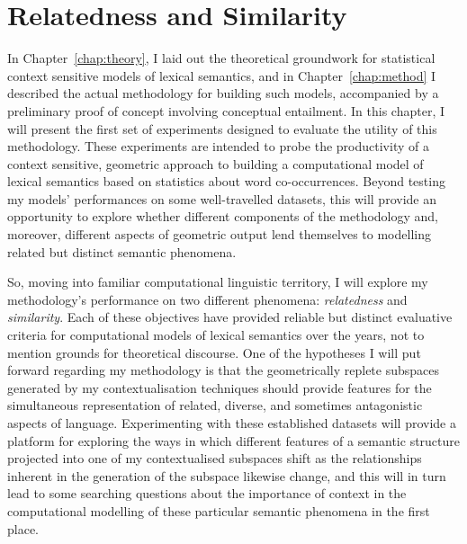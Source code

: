 \chapter{Relatedness and Similarity}
In Chapter~\ref{chap:theory}, I laid out the theoretical groundwork for statistical context sensitive models of lexical semantics, and in Chapter~\ref{chap:method} I described the actual methodology for building such models, accompanied by a preliminary proof of concept involving conceptual entailment.  In this chapter, I will present the first set of experiments designed to evaluate the utility of this methodology.  These experiments are intended to probe the productivity of a context sensitive, geometric approach to building a computational model of lexical semantics based on statistics about word co-occurrences.  Beyond testing my models' performances on some well-travelled datasets, this will provide an opportunity to explore whether different components of the methodology and, moreover, different aspects of geometric output lend themselves to modelling related but distinct semantic phenomena.

So, moving into familiar computational linguistic territory, I will explore my methodology's performance on two different phenomena: \emph{relatedness} and \emph{similarity}.  Each of these objectives have provided reliable but distinct evaluative criteria for computational models of lexical semantics over the years, not to mention grounds for theoretical discourse.  One of the hypotheses I will put forward regarding my methodology is that the geometrically replete subspaces generated by my contextualisation techniques should provide features for the simultaneous representation of related, diverse, and sometimes antagonistic aspects of language.  Experimenting with these established datasets will provide a platform for exploring the ways in which different features of a semantic structure projected into one of my contextualised subspaces shift as the relationships inherent in the generation of the subspace likewise change, and this will in turn lead to some searching questions about the importance of context in the computational modelling of these particular semantic phenomena in the first place.

